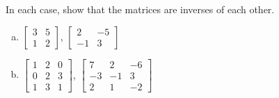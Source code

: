 \documentclass[../main.tex]{subfiles}
\begin{document}
In each case, show that the matrices are inverses of each other.
\begin{enumerate}[a)]
	\item
		$\left[\begin{array}{rr}
			3 & 5 \\
			1 & 2
		\end{array}\right]$,
		$\left[\begin{array}{rr}
			2 & -5 \\
			-1 & 3
		\end{array}\right]$
	\setcounter{enumi}{2}
	\item 
		$\left[\begin{array}{rrr}
			1 & 2 & 0 \\
			0 & 2 & 3 \\
			1 & 3 & 1
		\end{array}\right]$,
		$\left[\begin{array}{rrr}
			7 & 2 & -6 \\
			-3 & -1 & 3 \\
			2 & 1 & -2
		\end{array}\right]$
\end{enumerate}
\end{document}
